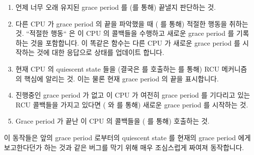 \begin{enumerate}
\item	언제 너무 오래 유지된 grace period 를 (를
	통해) 끝낼지 판단하는 것.
\item	다른 CPU 가 grace period 의 끝을 파악했을 때 (
	를 통해) 적절한 행동을 취하는 것.
	``적절한 행동`` 은 이 CPU 의 콜백들을 수행하고 새로운 grace period 를
	기록하는 것을 포함합니다.
	이 똑같은 함수는 다른 CPU 가 새로운 grace period 를 시작하는 것에 대한
	응답으로 상태를 업데이트 합니다.
\item	현재 CPU 의 quiescent state 들을 (결국은  를 호출하는
	 를 통해) RCU 메커니즘의 핵심에 알리는
	것.
	이는 물론 현재 grace period 의 끝을 표시합니다.
\item	진행중인 grace period 가 없고 이 CPU 가 여전히 grace period 를 기다리고
	있는 RCU 콜백들을 가지고 있다면 ( 와
	 를 통해) 새로운 grace period 를 시작하는 것.
\item	Grace period 가 끝난 이 CPU 의 콜백들을 ( 를 통해)
	호출하는 것.
\iffalse

\item	Determining when to take measures to end an over-long grace period
	(via \co{force_quiescent_state()}).
\item	Taking appropriate action when some other CPU detected the end of
	a grace period (via \co{rcu_process_gp_end()}).
	``Appropriate action`` includes advancing this CPU's
	callbacks and recording the new grace period.
	This same function updates state in response to some other
	CPU starting a new grace period.
\item	Reporting the current CPU's quiescent states to the core RCU
	mechanism (via \co{rcu_check_quiescent_state()}, which
	in turn invokes \co{cpu_quiet()}).
	This of course might mark the end of the current grace period.
\item	Starting a new grace period if there is no grace period in progress
	and this CPU has RCU callbacks still waiting for a grace period
	(via \co{cpu_needs_another_gp()} and
	\co{rcu_start_gp()}).
\item	Invoking any of this CPU's callbacks whose grace period has ended
	(via \co{rcu_do_batch()}).
\fi
\end{enumerate}

이 동작들은 앞의 grace period 로부터의 quiescent state 를 현재의 grace period
에게 보고한다던가 하는 것과 같은 버그를 막기 위해 매우 조심스럽게 짜여져
동작합니다.
\iffalse


